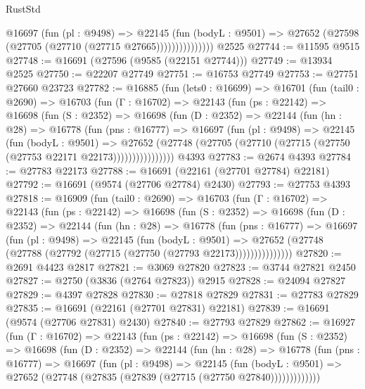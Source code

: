 \begin{lexlean}{RustStd}
\begin{coremodule}
                    @16697
                      (fun (pl : @9498) =>
                      @22145
                        (fun (bodyL : @9501) =>
                        @27652 (@27598 (@27705 (@27710 (@27715 @27665)))))))))))))))
    @2525
@27744 := @11595 @9515
@27748 := @16691 (@27596 (@9585 (@22151 @27744)))
@27749 := @13934 @2525
@27750 := @22207 @27749
@27751 := @16753 @27749
@27753 := @27751 @27660 @23723
@27782 := @16885
    (fun (lets0 : @16699) =>
    @16701
      (fun (tail0 : @2690) =>
      @16703
        (fun (Γ : @16702) =>
        @22143
          (fun (ps : @22142) =>
          @16698
            (fun (S : @2352) =>
            @16698
              (fun (D : @2352) =>
              @22144
                (fun (hn : @28) =>
                @16778
                  (fun (pns : @16777) =>
                  @16697
                    (fun (pl : @9498) =>
                    @22145
                      (fun (bodyL : @9501) =>
                      @27652
                        (@27748
                          (@27705 (@27710 (@27715 (@27750 (@27753 @22171 @22173))))))))))))))))
    @4393
@27783 := @2674 @4393
@27784 := @27783 @22173
@27788 := @16691 (@22161 (@27701 @27784) @22181)
@27792 := @16691 (@9574 (@27706 @27784) @2430)
@27793 := @27753 @4393
@27818 := @16909
    (fun (tail0 : @2690) =>
    @16703
      (fun (Γ : @16702) =>
      @22143
        (fun (ps : @22142) =>
        @16698
          (fun (S : @2352) =>
          @16698
            (fun (D : @2352) =>
            @22144
              (fun (hn : @28) =>
              @16778
                (fun (pns : @16777) =>
                @16697
                  (fun (pl : @9498) =>
                  @22145
                    (fun (bodyL : @9501) =>
                    @27652 (@27748 (@27788 (@27792 (@27715 (@27750 (@27793 @22173)))))))))))))))
@27820 := @2691 @4423 @2817
@27821 := @3069 @27820
@27823 := @3744 @27821 @2450
@27827 := @2750 (@3836 (@2764 @27823)) @2915
@27828 := @24094 @27827
@27829 := @4397 @27828
@27830 := @27818 @27829
@27831 := @27783 @27829
@27835 := @16691 (@22161 (@27701 @27831) @22181)
@27839 := @16691 (@9574 (@27706 @27831) @2430)
@27840 := @27793 @27829
@27862 := @16927
    (fun (Γ : @16702) =>
    @22143
      (fun (ps : @22142) =>
      @16698
        (fun (S : @2352) =>
        @16698
          (fun (D : @2352) =>
          @22144
            (fun (hn : @28) =>
            @16778
              (fun (pns : @16777) =>
              @16697
                (fun (pl : @9498) =>
                @22145
                  (fun (bodyL : @9501) =>
                  @27652 (@27748 (@27835 (@27839 (@27715 (@27750 @27840)))))))))))))

\end{coremodule}
\end{lexlean}

